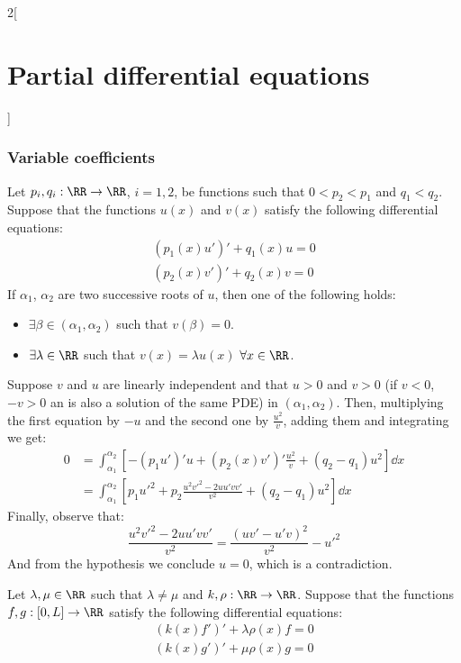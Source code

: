\documentclass[../../../main_math.tex]{subfiles}
\begin{document}
\begin{multicols}{2}[\section{Partial differential equations}]
  \subsubsection{Variable coefficients}
  \begin{theorem}
    Let $p_i,q_i:\RR\rightarrow\RR$, $i=1,2$, be functions such that $0<p_2<p_1$ and $q_1<q_2$. Suppose that the functions $u(x)$ and $v(x)$ satisfy the following differential equations:
    \begin{align*}
      {(p_1(x)u')}'+q_1(x)u=0 \\
      {(p_2(x)v')}'+q_2(x)v=0
    \end{align*}
    If $\alpha_1$, $\alpha_2$ are two successive roots of $u$, then one of the following holds:
    \begin{itemize}
      \item $\exists \beta\in(\alpha_1,\alpha_2)$ such that $v(\beta)=0$.
      \item $\exists\lambda\in\RR$ such that $v(x)=\lambda u(x)$ $\forall x\in\RR$.
    \end{itemize}
  \end{theorem}
  \begin{sproof}
    Suppose $v$ and $u$ are linearly independent and that $u>0$ and $v>0$ (if $v<0$, $-v>0$ an is also a solution of the same PDE) in $(\alpha_1,\alpha_2)$. Then, multiplying the first equation by $-u$ and the second one by $\frac{u^2}{v}$, adding them and integrating we get:
    \begin{align*}
      0 & =\int_{\alpha_1}^{\alpha_2}\left[-{(p_1u')}'u +{(p_2(x)v')}'\frac{u^2}{v} +(q_2 -q_1)u^2\right]\dd{x}  \\
        & =\int_{\alpha_1}^{\alpha_2}\left[p_1{u'}^2+p_2\frac{u^2{v'}^2-2uu'vv'}{v^2}+(q_2 -q_1)u^2\right]\dd{x}
    \end{align*}
    Finally, observe that: $$\frac{u^2{v'}^2- 2uu'vv'}{v^2}=\frac{{(uv'-u'v)}^2}{v^2}-{u'}^2$$ And from the hypothesis we conclude $u=0$, which is a contradiction.
  \end{sproof}
  \begin{proposition}\label{PDE:orthogonality}
    Let $\lambda,\mu\in\RR$ such that $\lambda\ne \mu$ and $k,\rho:\RR\rightarrow\RR$. Suppose that the functions $f,g:[0,L]\rightarrow\RR$ satisfy the following differential equations:
    \begin{align*}
      {(k(x)f')}'+\lambda \rho(x)f=0 \\
      {(k(x)g')}'+\mu \rho(x)g=0
    \end{align*}

\end{proposition}
\end{multicols}
\end{document}
